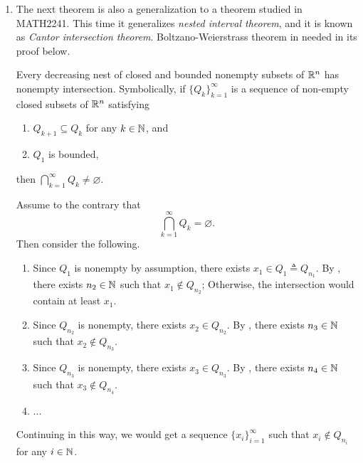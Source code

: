 \begin{enumerate}
\item The next theorem is also a generalization to a theorem studied in
MATH2241. This time it generalizes \emph{nested interval theorem}, and it is
known as \emph{Cantor intersection theorem}. Boltzano-Weierstrass theorem in
needed in its proof below.
\begin{theorem}
\label{thm:cantor-intersection}
Every decreasing nest of closed and bounded nonempty subsets of \(\mathbb{R}^n\) has
nonempty intersection. Symbolically, if \(\{Q_k\}_{k=1}^{\infty}\) is a
sequence of non-empty closed subsets of \(\mathbb{R}^n\) satisfying
\begin{enumerate}
\item \(Q_{k+1}\subseteq Q_k\) for any \(k\in\mathbb{N}\), and
\item \(Q_1\) is bounded,
\end{enumerate}
then \(\bigcap_{k=1}^{\infty}Q_k\ne\varnothing\).
\end{theorem}
\begin{pf}
Assume to the contrary that 
\begin{equation}
\label{eq:cantor-int-contrary-assum}
\bigcap_{k=1}^{\infty}Q_k=\varnothing.
\end{equation}
Then consider the following.
\begin{enumerate}[label={(\arabic*)}]
\item Since \(Q_1\) is nonempty by assumption, there exists \(x_1\in Q_1\triangleq Q_{n_1}\). By
, there exists \(n_2\in\mathbb{N}\) such that \(x_1\notin
Q_{n_2}\); Otherwise, the intersection would contain at least \(x_1\).
\item Since \(Q_{n_2}\) is nonempty, there exists \(x_2\in Q_{n_2}\).
By , there exists \(n_3\in\mathbb{N}\) such that
\(x_2\notin Q_{n_3}\).
\item Since \(Q_{n_3}\) is nonempty, there exists \(x_3\in Q_{n_3}\).
By , there exists \(n_4\in\mathbb{N}\) such that
\(x_3\notin Q_{n_4}\).
\item ...
\end{enumerate}
Continuing in this way, we would get a sequence \(\{x_i\}_{i=1}^{\infty}\) such
that \(x_i\notin Q_{n_i}\) for any \(i\in\mathbb{N}\).
\begin{center}
\end{center}
\end{pf}
\end{enumerate}

